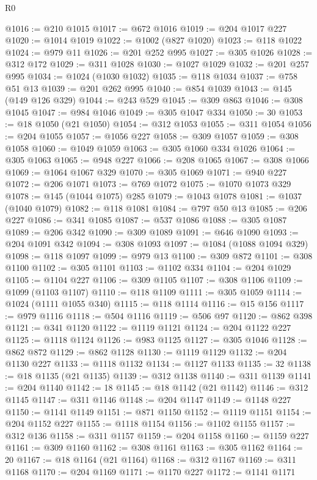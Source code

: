 \begin{lexlean}{R0}
\begin{coremodule}
@1016 := @210 @1015
@1017 := @672 @1016
@1019 := @204 @1017 @227
@1020 := @1014 @1019
@1022 := @1002 (@827 @1020)
@1023 := @118 @1022
@1024 := @979 @11
@1026 := @201 @252 @995
@1027 := @305 @1026
@1028 := @312 @172
@1029 := @311 @1028
@1030 := @1027 @1029
@1032 := @201 @257 @995
@1034 := @1024 (@1030 @1032)
@1035 := @118 @1034
@1037 := @758 @51 @13
@1039 := @201 @262 @995
@1040 := @854 @1039
@1043 := @145 (@149 @126 @329)
@1044 := @243 @529
@1045 := @309 @863
@1046 := @308 @1045
@1047 := @984 @1046
@1049 := @305 @1047 @334
@1050 := 30
@1053 := @18 @1050 (@21 @1050)
@1054 := @312 @1053
@1055 := @311 @1054
@1056 := @204 @1055
@1057 := @1056 @227
@1058 := @309 @1057
@1059 := @308 @1058
@1060 := @1049 @1059
@1063 := @305 @1060 @334 @1026
@1064 := @305 @1063
@1065 := @948 @227
@1066 := @208 @1065
@1067 := @308 @1066
@1069 := @1064 @1067 @329
@1070 := @305 @1069
@1071 := @940 @227
@1072 := @206 @1071
@1073 := @769 @1072
@1075 := @1070 @1073 @329
@1078 := @145 (@1044 @1075) @285
@1079 := @1043 @1078
@1081 := @1037 (@1040 @1079)
@1082 := @118 @1081
@1084 := @797 @50 @13
@1085 := @206 @227
@1086 := @341 @1085
@1087 := @537 @1086
@1088 := @305 @1087
@1089 := @206 @342
@1090 := @309 @1089
@1091 := @646 @1090
@1093 := @204 @1091 @342
@1094 := @308 @1093
@1097 := @1084 (@1088 @1094 @329)
@1098 := @118 @1097
@1099 := @979 @13
@1100 := @309 @872
@1101 := @308 @1100
@1102 := @305 @1101
@1103 := @1102 @334
@1104 := @204 @1029
@1105 := @1104 @227
@1106 := @309 @1105
@1107 := @308 @1106
@1109 := @1099 (@1103 @1107)
@1110 := @118 @1109
@1111 := @305 @1059
@1114 := @1024 (@1111 @1055 @340)
@1115 := @118 @1114
@1116 := @15 @156
@1117 := @979 @1116
@1118 := @504 @1116
@1119 := @506 @97
@1120 := @862 @398
@1121 := @341 @1120
@1122 := @1119 @1121
@1124 := @204 @1122 @227
@1125 := @1118 @1124
@1126 := @983 @1125
@1127 := @305 @1046
@1128 := @862 @872
@1129 := @862 @1128
@1130 := @1119 @1129
@1132 := @204 @1130 @227
@1133 := @1118 @1132
@1134 := @1127 @1133
@1135 := 32
@1138 := @18 @1135 (@21 @1135)
@1139 := @312 @1138
@1140 := @311 @1139
@1141 := @204 @1140
@1142 := 18
@1145 := @18 @1142 (@21 @1142)
@1146 := @312 @1145
@1147 := @311 @1146
@1148 := @204 @1147
@1149 := @1148 @227
@1150 := @1141 @1149
@1151 := @871 @1150
@1152 := @1119 @1151
@1154 := @204 @1152 @227
@1155 := @1118 @1154
@1156 := @1102 @1155
@1157 := @312 @136
@1158 := @311 @1157
@1159 := @204 @1158
@1160 := @1159 @227
@1161 := @309 @1160
@1162 := @308 @1161
@1163 := @305 @1162
@1164 := 20
@1167 := @18 @1164 (@21 @1164)
@1168 := @312 @1167
@1169 := @311 @1168
@1170 := @204 @1169
@1171 := @1170 @227
@1172 := @1141 @1171

\end{coremodule}
\end{lexlean}
